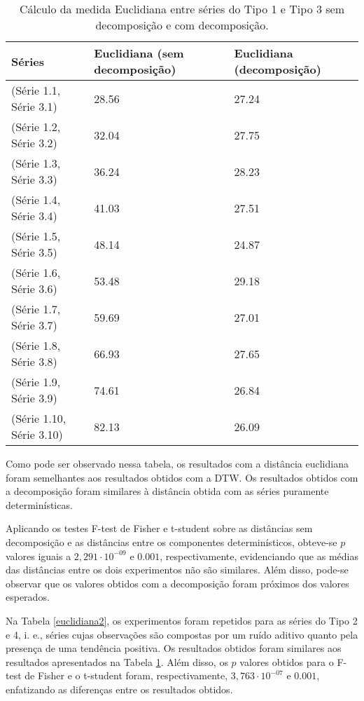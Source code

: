 \begin{table}[!ht]
\centering
\caption{Cálculo da medida Euclidiana entre séries do Tipo 1 e Tipo 3 sem decomposição e com decomposição.}
\begin{tabular}{lll}
  \hline
 Séries & Euclidiana (sem decomposição) & Euclidiana (decomposição) \\
  \hline
  \hline
(Série 1.1, Série 3.1) & 28.56 & 27.24 \\ 
(Série 1.2, Série 3.2) & 32.04 & 27.75\\
(Série 1.3, Série 3.3) & 36.24 & 28.23\\ 
(Série 1.4, Série 3.4) & 41.03 & 27.51\\
(Série 1.5, Série 3.5) & 48.14 & 24.87 \\
(Série 1.6, Série 3.6) & 53.48 & 29.18\\
(Série 1.7, Série 3.7) & 59.69 & 27.01\\ 
(Série 1.8, Série 3.8) & 66.93 & 27.65\\ 
(Série 1.9, Série 3.9) & 74.61 & 26.84\\ 
(Série 1.10, Série 3.10) & 82.13 & 26.09\\ 
   \hline
\end{tabular}
\label{euclidiana}
\end{table}

Como pode ser observado nessa tabela, os resultados com a distância euclidiana foram semelhantes aos resultados obtidos com a DTW. Os resultados obtidos com a decomposição foram similares à distância obtida com as séries puramente determinísticas. 

Aplicando os testes F-test de Fisher e t-student sobre as distâncias sem decomposição e as distâncias entre os componentes determinísticos, obteve-se $p$ valores iguais a $2,291 \cdot 10^{-09}$ e $0.001$, respectivamente, evidenciando que as médias das distâncias entre os dois experimentos não são similares. Além disso, pode-se observar que os valores obtidos com a decomposição foram próximos dos valores esperados.

Na Tabela \ref{euclidiana2}, os experimentos foram repetidos para as séries do Tipo 2 e 4, i. e., séries cujas observações são compostas por um ruído aditivo quanto pela presença de uma tendência positiva. Os resultados obtidos foram similares aos resultados apresentados na Tabela \ref{euclidiana}. Além disso, os $p$ valores obtidos para o F-test de Fisher e o t-student foram, respectivamente,  $3,763 \cdot 10^{-07}$ e $0.001$, enfatizando as diferenças entre os resultados obtidos.

